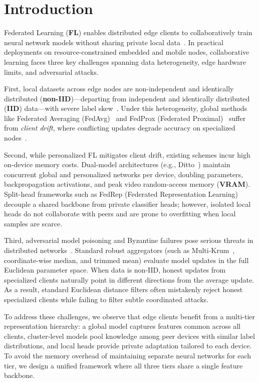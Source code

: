 \section{Introduction}
\label{sec:intro}

Federated Learning (\textbf{FL}) enables distributed edge clients to collaboratively train neural network models without sharing private local data~\cite{mcmahan2017communication,kairouz2021advances}. In practical deployments on resource-constrained embedded and mobile nodes, collaborative learning faces three key challenges spanning data heterogeneity, edge hardware limits, and adversarial attacks.

First, local datasets across edge nodes are non-independent and identically distributed (\textbf{non-IID})---departing from independent and identically distributed (\textbf{IID}) data---with severe label skew~\cite{hsu2019measuring}. Under this heterogeneity, global methods like Federated Averaging (FedAvg)~\cite{mcmahan2017communication} and FedProx (Federated Proximal)~\cite{li2020federated} suffer from \textit{client drift}, where conflicting updates degrade accuracy on specialized nodes~\cite{li2020fair}.

Second, while personalized FL mitigates client drift, existing schemes incur high on-device memory costs. Dual-model architectures (e.g., Ditto~\cite{li2021ditto}) maintain concurrent global and personalized networks per device, doubling parameters, backpropagation activations, and peak video random-access memory (\textbf{VRAM}). Split-head frameworks such as FedRep (Federated Representation Learning)~\cite{collins2021exploiting} decouple a shared backbone from private classifier heads; however, isolated local heads do not collaborate with peers and are prone to overfitting when local samples are scarce.

Third, adversarial model poisoning and Byzantine failures pose serious threats in distributed networks~\cite{blanchard2017machine,yin2018byzantine,fang2020local}. Standard robust aggregators (such as Multi-Krum~\cite{blanchard2017machine}, coordinate-wise median, and trimmed mean) evaluate model updates in the full Euclidean parameter space. When data is non-IID, honest updates from specialized clients naturally point in different directions from the average update. As a result, standard Euclidean distance filters often mistakenly reject honest specialized clients while failing to filter subtle coordinated attacks.

To address these challenges, we observe that edge clients benefit from a multi-tier representation hierarchy: a global model captures features common across all clients, cluster-level models pool knowledge among peer devices with similar label distributions, and local heads provide private adaptation tailored to each device. To avoid the memory overhead of maintaining separate neural networks for each tier, we design a unified framework where all three tiers share a single feature backbone.

